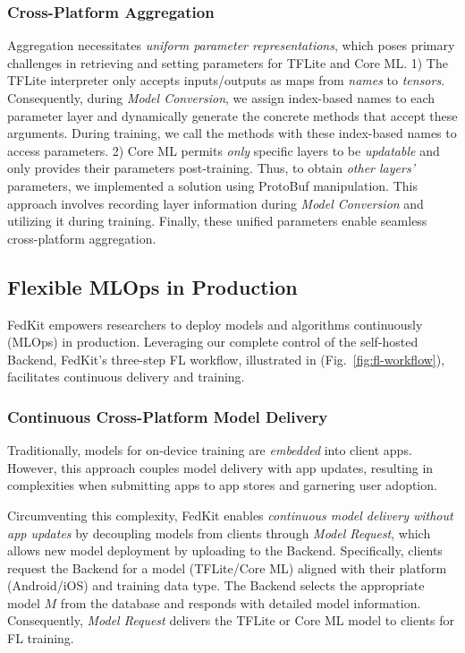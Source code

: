 \documentclass[letterpaper]{article} %
\begin{document}
\subsubsection{Cross-Platform Aggregation}
Aggregation necessitates
\textit{uniform parameter representations},
which poses primary challenges in
retrieving and setting parameters for TFLite and Core ML.
1)
The TFLite interpreter only accepts inputs/outputs as maps from \textit{names} to
\textit{tensors}.
Consequently, during \textit{Model Conversion},
we assign index-based names to each parameter layer and
dynamically generate the concrete methods that accept these arguments.
During training, we call the methods with these index-based names to
access parameters.
2)
Core ML permits \textit{only} specific layers to be \textit{updatable} and
only provides their parameters post-training.
Thus, to obtain \textit{other layers'} parameters,
we implemented a solution using ProtoBuf manipulation.
This approach involves recording layer information
during \textit{Model Conversion} and
utilizing it during training.
Finally, these unified parameters enable seamless cross-platform aggregation.

\subsection{Flexible MLOps in Production}
\newcommand{\model}{$M$}
\newcommand{\fs}{$S_\mathrm F$}
FedKit empowers researchers to deploy models and algorithms continuously (MLOps)
in production.
Leveraging our complete control of the self-hosted Backend,
FedKit's three-step FL workflow, illustrated in (Fig.~\ref{fig:fl-workflow}),
facilitates continuous delivery and training.
\subsubsection{Continuous Cross-Platform Model Delivery}
Traditionally, models for on-device training are \textit{embedded} into client apps.
However, this approach couples model delivery with app updates, 
resulting in complexities when submitting apps to app stores and garnering user adoption.

Circumventing this complexity,
FedKit enables \textit{continuous model delivery without app updates} by
decoupling models from clients through \textit{Model Request},
which allows new model deployment by uploading to the Backend.
Specifically, clients request the Backend for a model (TFLite/Core ML)
aligned with
their platform (Android/iOS) and training data type.
The Backend selects the appropriate model \model{} from the database and
responds with detailed model information.
Consequently, \textit{Model Request} delivers the TFLite or Core ML model
to clients for FL training.
\end{document}
